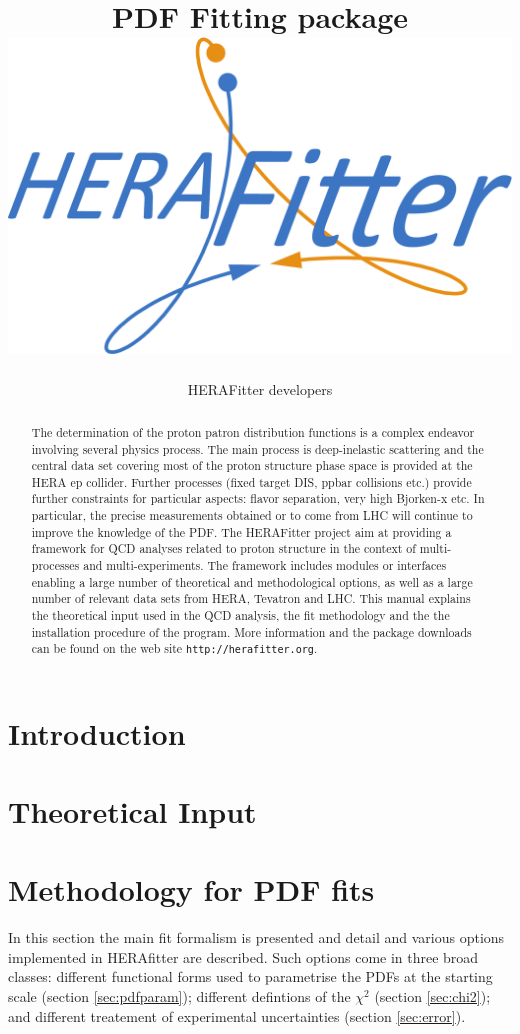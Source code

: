 \documentclass[11pt,twoside,a4paper]{article}
\title{ \vspace{1cm} {\Huge \fitter\ } \\
              PDF Fitting package  \\ 
              \vspace{0.5cm}
\includegraphics[width=0.25\linewidth]{figures/logo.pdf}}
\author{HERAFitter developers}
\begin{document}
\maketitle
\vspace{4cm}
\begin{abstract}
\vspace{0.5cm}
The determination of the  proton patron distribution functions is a complex endeavor involving several physics process. The main process is deep-inelastic scattering and the central  data set covering most of the proton structure phase space is provided at the HERA ep collider. Further processes (fixed target DIS, ppbar collisions etc.) provide further constraints for particular aspects: flavor separation, very high Bjorken-x etc. In particular, the precise measurements obtained or to come from LHC will continue to improve the knowledge of the PDF. The HERAFitter project aim at providing a framework for QCD analyses related to proton structure in the context of multi-processes and multi-experiments. The framework includes modules or interfaces enabling a large number of theoretical and methodological options, as well as a large number of relevant data sets from HERA, Tevatron and LHC. This manual explains the theoretical input used in the QCD analysis, the fit  methodology and the  the installation procedure of the program. More information and the package downloads can be found on the web site {\tt http://herafitter.org}.
\end{abstract}
\thispagestyle{empty}
\newpage
\tableofcontents
\newpage
\section{Introduction}
  
\section{Theoretical Input}


\section{Methodology for PDF fits}
In this section the main fit formalism is presented and 
detail and various options implemented in HERAfitter are described. 
Such options come in three broad classes: different functional forms
used to 
parametrise the PDFs at the starting scale (section \ref{sec:pdfparam});
different defintions of the $\chi^2$ (section \ref{sec:chi2}); 
and different treatement of experimental uncertainties (section \ref{sec:error}).
\end{document}
